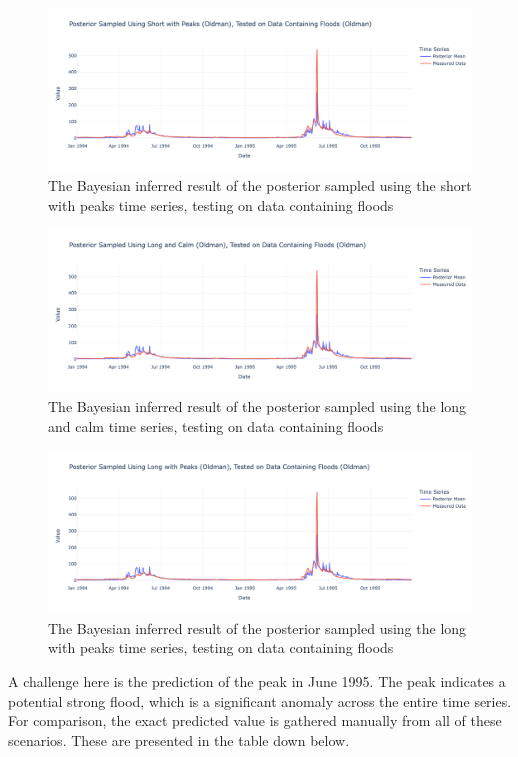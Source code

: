 \begin{figure}[H]
    \centering
    \includegraphics[width=.7\textwidth]{figures/time_series_analysis/ts_int/1_1.png}
    \captionsetup{width=.8\textwidth}
    \caption{The Bayesian inferred result of the posterior sampled using the short with peaks time series, testing on data containing floods}
    \label{fig:enter-label}
\end{figure}

\begin{figure}[H]
    \centering
    \includegraphics[width=.7\textwidth]{figures/time_series_analysis/ts_int/2_1.png}
    \captionsetup{width=.8\textwidth}
    \caption{The Bayesian inferred result of the posterior sampled using the long and calm time series, testing on data containing floods}
    \label{fig:enter-label}
\end{figure}

\begin{figure}[H]
    \centering
    \includegraphics[width=.7\textwidth]{figures/time_series_analysis/ts_int/3_1.png}
    \captionsetup{width=.8\textwidth}
    \caption{The Bayesian inferred result of the posterior sampled using the long with peaks time series, testing on data containing floods}
    \label{fig:enter-label}
\end{figure}

A challenge here is the prediction of the peak in June 1995. The peak indicates a potential strong flood, which is a significant anomaly across the entire time series. For comparison, the exact predicted value is gathered manually from all of these scenarios. These are presented in the table down below.

